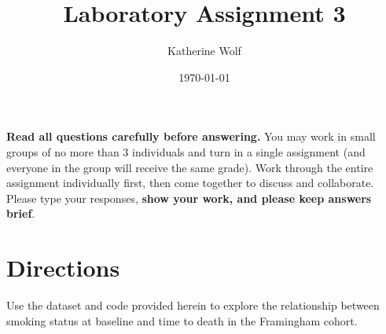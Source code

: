 \documentclass{article}\usepackage[]{graphicx}\usepackage[]{color}
\title{Laboratory Assignment 3}
\author{Katherine Wolf}
\date{\today}
\newif\ifdraft  %
\begin{document}
  \vspace*{-2cm}
  {\let\newpage\relax\maketitle}
  
\maketitle

\ifdraft

\textbf{Read all questions carefully before answering.} You may work in small groups of no more than 3 individuals and turn in a single assignment (and everyone in the group will receive the same grade). Work through the entire assignment individually first, then come together to discuss and collaborate. Please type your responses, \textbf{show your work, and please keep answers brief}.

\section*{Directions}

\vspace{2mm}

Use the dataset  and code provided herein to explore the relationship between smoking status at baseline and time to death in the Framingham cohort.
\end{document}
